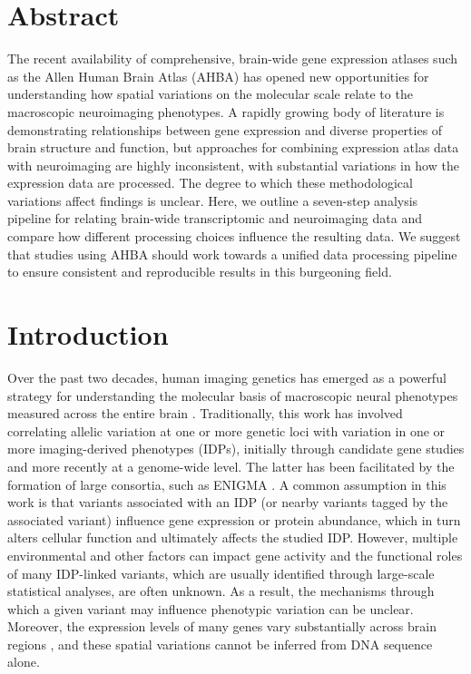\section*{Abstract}
The recent availability of comprehensive, brain-wide gene expression atlases such as the Allen Human Brain Atlas (AHBA) has opened new opportunities for understanding how spatial variations on the molecular scale relate to the macroscopic neuroimaging phenotypes. A rapidly growing body of literature is demonstrating relationships between gene expression and diverse properties of brain structure and function, but approaches for combining expression atlas data with neuroimaging are highly inconsistent, with substantial variations in how the expression data are processed. The degree to which these methodological variations affect findings is unclear. Here, we outline a seven-step analysis pipeline for relating brain-wide transcriptomic and neuroimaging data and compare how different processing choices influence the resulting data. We suggest that studies using AHBA should work towards a unified data processing pipeline to ensure consistent and reproducible results in this burgeoning field.

\section{Introduction}

Over the past two decades, human imaging genetics has emerged as a powerful strategy for understanding the molecular basis of macroscopic neural phenotypes measured across the entire brain \citep{Meyer-Lindenberg2006a,Munoz2009,Arslan2015,Hashimoto2015}. Traditionally, this work has involved correlating allelic variation at one or more genetic loci with variation in one or more imaging-derived phenotypes (IDPs), initially through candidate gene studies and more recently at a genome-wide level. The latter has been facilitated by the formation of large consortia, such as ENIGMA \citep{Thompson2014}. A common assumption in this work is that variants associated with an IDP (or nearby variants tagged by the associated variant) influence gene expression or protein abundance, which in turn alters cellular function and ultimately affects the studied IDP. However, multiple environmental and other factors can impact gene activity \citep{Fraser2005,Choi2007,Cole2009} and the functional roles of many IDP-linked variants, which are usually identified through large-scale statistical analyses, are often unknown. As a result, the mechanisms through which a given variant may influence phenotypic variation can be unclear. Moreover, the expression levels of many genes vary substantially across brain regions \citep{Hawrylycz2015}, and these spatial variations cannot be inferred from DNA sequence alone.


